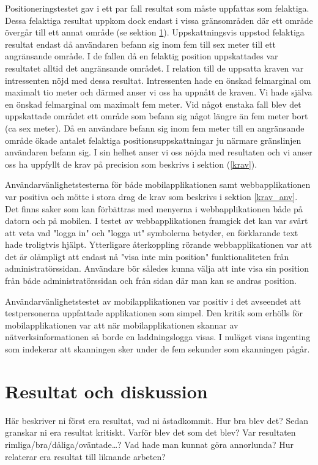 \documentclass[a4paper,12pt]{article}
\begin{document}
 Positioneringstestet gav i ett par fall resultat som måste uppfattas som felaktiga. Dessa felaktiga resultat uppkom dock endast i vissa gränsområden där ett område övergår till ett annat område (se sektion \ref{resultat}). Uppskattningsvis uppstod felaktiga resultat endast då användaren befann sig inom fem till sex meter till ett angränsande område. I de fallen då en felaktig position uppskattades var resultatet alltid det angränsande området. I relation till de uppsatta kraven var intressenten nöjd med dessa resultat. Intressenten hade en önskad felmarginal om maximalt tio meter och därmed anser vi oss ha uppnått de kraven. Vi hade själva en önskad felmarginal om maximalt fem meter. Vid något enstaka fall blev det uppskattade området ett område som befann sig något längre än fem meter bort (ca sex meter). Då en användare befann sig inom fem meter till en angränsande område ökade antalet felaktiga positionsuppskattningar ju närmare gränslinjen användaren befann sig. I sin helhet anser vi oss nöjda med resultaten och vi anser oss ha uppfyllt de krav på precision som beskrivs i sektion (\ref{krav}).

 Användarvänlighetstesterna för både mobilapplikationen samt webbapplikationen var positiva och mötte i stora drag de krav som beskrivs i sektion \ref{krav_anv}. Det finns saker som kan förbättras med menyerna i webbapplikationen både på datorn och på mobilen. I testet av webbapplikationen framgick det kan var svårt att veta vad "logga in" och "logga ut" symbolerna betyder, en förklarande text hade troligtvis hjälpt. Ytterligare återkoppling rörande webbapplikationen var att det är olämpligt att endast nå "visa inte min position" funktionaliteten från administratörssidan. Användare bör således kunna välja att inte visa sin position från både administratörssidan och från sidan där man kan se andras position.

 Användarvänlighetstestet av mobilapplikationen var positiv i det avseendet att testpersonerna uppfattade applikationen som simpel. Den kritik som erhölls för mobilapplikationen var att när mobilapplikationen skannar av nätverksinformationen så borde en laddningslogga visas. I nuläget visas ingenting som indekerar att skanningen sker under de fem sekunder som skanningen pågår.


 \section{Resultat och diskussion}\label{resultat}
 \iffalse Här beskriver ni först era resultat, vad ni åstadkommit.  Hur bra blev det?
 Sedan granskar ni era resultat kritiskt.  Varför blev det som det blev?  Var resultaten rimliga/bra/dåliga/o\-vän\-ta\-de\ldots?
 Vad hade man kunnat göra annorlunda?  Hur relaterar era resultat till liknande arbeten?
\end{document}
